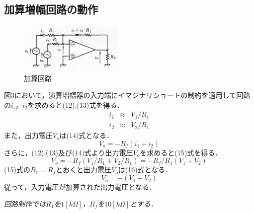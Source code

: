 \documentclass[10pt, a4j, dvipdfmx]{jarticle}
\begin{document}
\subsection{加算増幅回路の動作}
\begin{figure}
    \vspace*{-\intextsep}
    \begin{center}
     \includegraphics[width=50mm]{text/fig-3.jpg}
     \caption{加算回路}
    \end{center}
\end{figure}
図3において，演算増幅器の入力端にイマジナリショートの制約を適用して回路の$i_i$，$i_2$を求めると(12),(13)式を得る．
\begin{eqnarray}
    i_1 & \approx & V_1 / R_1 \\
    i_2 & \approx & V_2 / R_1
\end{eqnarray}
また，出力電圧$V_o$は(14)式となる．
\begin{equation}
    V_o = -R_f (i_1 + i_2)
\end{equation}
さらに，(12),(13)及び(14)式より出力電圧$V_o$を求めると(15)式を得る．
\begin{equation}
    V_o = -R_f (V_1 / R_1 + V_2 / R_1) = -R_f / R_1 (V_1 + V_2)
\end{equation}
(15)式の$R_1 = R_f$とおくと出力電圧$V_o$は(16)式となる．
\begin{equation}
    V_o = -(V_1 + V_2)
\end{equation}
従って，入力電圧が加算された出力電圧となる．

\emph{回路制作では$R_1$を$1[k\Omega]$，$R_f$を$10[k\Omega]$とする．}
\end{document}
